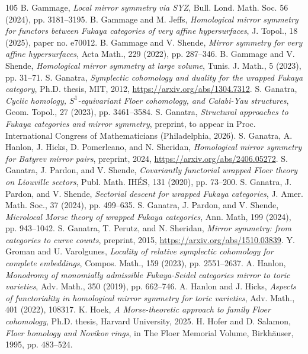 \documentclass[UTF8,a4paper,11pt,fontset=windows]{ctexart}
\theoremstyle{cnthm}
\numberwithin{equation}{section}
\begin{document}
\begin{thebibliography}{105}
 B. Gammage, \emph{Local mirror symmetry via SYZ}, Bull. Lond. Math. Soc. 56 (2024), pp. 3181--3195.
 B. Gammage and M. Jeffs, \emph{Homological mirror symmetry for functors between Fukaya categories of very affine hypersurfaces}, J. Topol., 18 (2025), paper no. e70012.
 B. Gammage and V. Shende, \emph{Mirror symmetry for very affine hypersurfaces}, Acta Math., 229 (2022), pp. 287--346.
 B. Gammage and V. Shende, \emph{Homological mirror symmetry at large volume}, Tunis. J. Math., 5 (2023), pp. 31--71.
 S. Ganatra, \emph{Symplectic cohomology and duality for the wrapped Fukaya category}, Ph.D. thesis, MIT, 2012, \url{https://arxiv.org/abs/1304.7312}.
 S. Ganatra, \emph{Cyclic homology, $S^1$-equivariant Floer cohomology, and Calabi-Yau structures}, Geom. Topol., 27 (2023), pp. 3461--3584.
 S. Ganatra, \emph{Structural approaches to Fukaya categories and mirror symmetry}, preprint, to appear in Proc. International Congress of Mathematicians (Philadelphia, 2026).
 S. Ganatra, A. Hanlon, J. Hicks, D. Pomerleano, and N. Sheridan, \emph{Homological mirror symmetry for Batyrev mirror pairs}, preprint, 2024, \url{https://arxiv.org/abs/2406.05272}.
 S. Ganatra, J. Pardon, and V. Shende, \emph{Covariantly functorial wrapped Floer theory on Liouville sectors}, Publ. Math. IH\'ES, 131 (2020), pp. 73--200.
 S. Ganatra, J. Pardon, and V. Shende, \emph{Sectorial descent for wrapped Fukaya categories}, J. Amer. Math. Soc., 37 (2024), pp. 499--635.
 S. Ganatra, J. Pardon, and V. Shende, \emph{Microlocal Morse theory of wrapped Fukaya categories}, Ann. Math, 199 (2024), pp. 943--1042.
 S. Ganatra, T. Perutz, and N. Sheridan, \emph{Mirror symmetry: from categories to curve counts}, preprint, 2015, \url{https://arxiv.org/abs/1510.03839}.
 Y. Groman and U. Varolgunes, \emph{Locality of relative symplectic cohomology for complete embeddings}, Compos. Math., 159 (2023), pp. 2551--2637.
 A. Hanlon, \emph{Monodromy of monomially admissible Fukaya-Seidel categories mirror to toric varieties}, Adv. Math., 350 (2019), pp. 662--746.
 A. Hanlon and J. Hicks, \emph{Aspects of functoriality in homological mirror symmetry for toric varieties}, Adv. Math., 401 (2022), 108317.
 K. Hoek, \emph{A Morse-theoretic approach to family Floer cohomology}, Ph.D. thesis, Harvard University, 2025.
 H. Hofer and D. Salamon, \emph{Floer homology and Novikov rings}, in The Floer Memorial Volume, Birkh\"auser, 1995, pp. 483--524.

\end{thebibliography}
\end{document}
